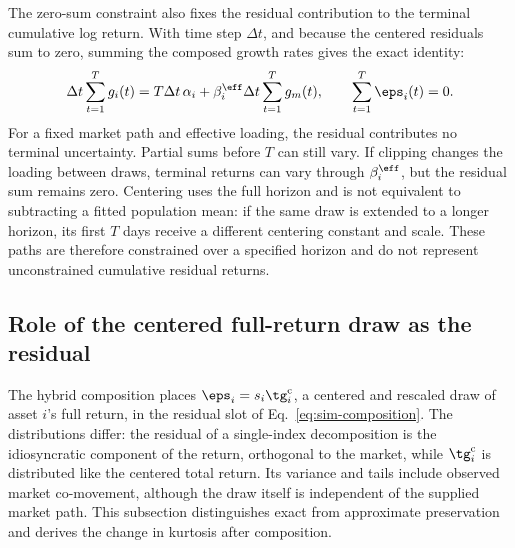 The zero-sum constraint also fixes the residual contribution to the
terminal cumulative log return. With time step $\Delta t$, and because
the centered residuals sum to zero, summing the composed growth rates
gives the exact identity:
\begin{equation}
  \Delta t\sum_{t=1}^{T} g_i(t)
  = T\Delta t\,\alpha_i
    + \beta_i^{\eff}\Delta t\sum_{t=1}^{T}g_m(t),
  \qquad \sum_{t=1}^{T}\eps_i(t)=0.
  \label{eq:supp-zero-sum-terminal}
\end{equation}
For a fixed market path and effective loading, the residual contributes
no terminal uncertainty. Partial sums before $T$ can still vary. If
clipping changes the loading between draws, terminal returns can vary
through $\beta_i^{\eff}$, but the residual sum remains zero. Centering
uses the full horizon and is not equivalent to subtracting a fitted
population mean: if the same draw is extended to a longer horizon, its
first $T$ days receive a different centering constant and scale. These
paths are therefore constrained over a specified horizon and do not
represent unconstrained cumulative residual returns.

\subsection{Role of the centered full-return draw as the residual}
\label{sec:supp-residual-choice}

The hybrid composition places $\eps_i = s_i \tg_i^{\mathrm c}$, a
centered and rescaled draw of asset $i$'s full return, in the residual
slot of Eq.~\eqref{eq:sim-composition}. The distributions differ: the residual of a single-index decomposition is the
idiosyncratic component of the return, orthogonal to the market, while
$\tg_i^{\mathrm c}$ is distributed like the centered total return. Its variance and tails include observed market co-movement, although
the draw itself is independent of the supplied market path. This subsection distinguishes exact from approximate preservation
and derives the change in kurtosis after composition.

